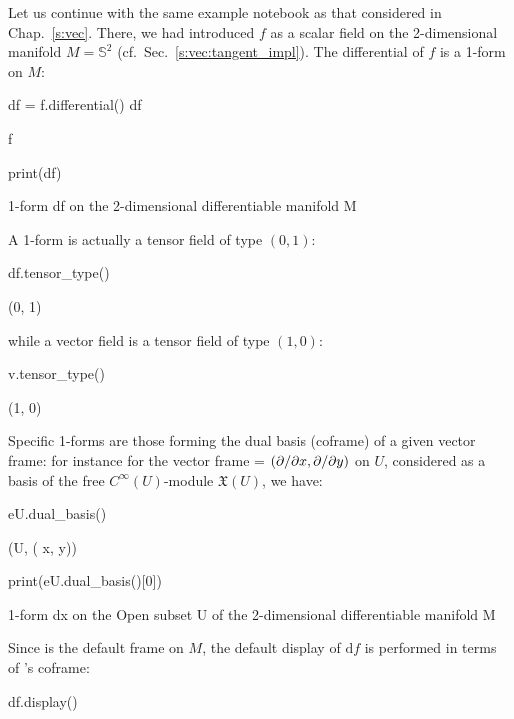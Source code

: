 Let us continue with the same example notebook as that considered in
Chap.~\ref{s:vec}. There, we had introduced $f$ as a scalar field on
the 2-dimensional manifold $M = \mathbb{S}^2$ (cf.\ Sec.~\ref{s:vec:tangent_impl}).
The differential of $f$ is a 1-form on $M$:
\begin{NBin}
df = f.differential()
df
\end{NBin}
\begin{NBoutM}
f
\end{NBoutM}
\vspace*{-\baselineskip}
\begin{NBin}
print(df)
\end{NBin}
\begin{NBprint}
1-form df on the 2-dimensional differentiable manifold M
\end{NBprint}
A 1-form is actually a tensor field of type $(0,1)$:
\begin{NBin}
df.tensor_type()
\end{NBin}
\begin{NBoutM}
\left(0, 1\right)
\end{NBoutM}
while a vector field is a tensor field of type $(1,0)$:
\begin{NBin}
v.tensor_type()
\end{NBin}
\begin{NBoutM}
\left(1, 0\right)
\end{NBoutM}
Specific 1-forms are those forming the dual basis (coframe) of a given vector
frame: for instance for the vector frame  = $({\partial }/{\partial x},{\partial }/{\partial y})$
on $U$, considered as a basis of the free $C^\infty(U)$-module $\mathfrak{X}(U)$,
we have:
\begin{NBin}
eU.dual_basis()
\end{NBin}
\begin{NBoutM}
\left(U, \left( x, y\right)\right)
\end{NBoutM}
\vspace*{-\baselineskip}
\begin{NBin}
print(eU.dual_basis()[0])
\end{NBin}
\begin{NBprint}
1-form dx on the Open subset U of the 2-dimensional differentiable manifold M
\end{NBprint}
Since  is the default frame on $M$, the default display of $\mathrm{d}f$
is performed in terms of 's coframe:
\begin{NBin}
df.display()
\end{NBin}
